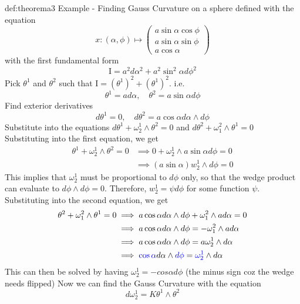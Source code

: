 \documentclass[landscape, 8pt]{extarticle}
\begin{document}
\begin{multicols}{3}
\begin{xmp}{def:theorema}{3}
    Example - Finding Gauss Curvature on a sphere defined with the equation
    \[x:(\alpha, \phi)\mapsto \begin{pmatrix}
        a\sin\alpha \cos\phi \\
        a\sin\alpha \sin\phi \\
        a\cos\alpha
    \end{pmatrix}\]
    with the first fundamental form
    \[\mathrm{I} = a^{2}d\alpha^{2} + a^{2}\sin^{2}\alpha d\phi^{2}\]
    Pick \(\theta^{1}\) and \(\theta^{2}\) such that \(\mathrm{I} = (\theta^{1})^{2} + (\theta^{1})^{2}\). i.e.
    \[\theta^{1} = ad\alpha,\quad \theta^{2} = a\sin\alpha d\phi\]
    Find exterior derivatives
    \[d\theta^{1} = 0 , \quad d\theta^{2} = a\cos\alpha d\alpha\wedge d\phi\]
    Substitute into the equations \(d\theta^{1} + \omega^{1}_{2}\wedge \theta^{2} = 0\) and \(d\theta^{2} + \omega^{2}_{1}\wedge \theta^{1} = 0\)
    Substituting into the first equation, we get
    \begin{align*}
        \theta^{1} + \omega^{1}_{2}\wedge \theta^{2} = 0 &\implies 0 + \omega^{1}_{2}\wedge a\sin\alpha d\phi = 0 \\
        &\implies (a\sin\alpha) w^{1}_{2} \wedge d\phi = 0
    \end{align*}
    This implies that \(\omega^{1}_{2}\) must be proportional to \(d\phi\) only, so that the wedge product can evaluate to \(d\phi \wedge d\phi = 0\). Therefore, \(w^{1}_{2} = \psi d\phi\) for some function \(\psi\). Substituting into the second equation, we get
    \begin{align*}
        \theta^{2} + \omega^{2}_{1}\wedge \theta^{1} = 0 &\implies a\cos\alpha d\alpha\wedge d\phi + \omega^{2}_{1}\wedge ad\alpha = 0 \\
        &\implies a\cos\alpha d\alpha\wedge d\phi = -\omega^{2}_{1}\wedge ad\alpha \\
        &\implies a\cos\alpha d\alpha\wedge d\phi = a\omega^{1}_{2}\wedge d\alpha \\
        &\implies \textcolor{blue}{\cos\alpha} d\alpha\wedge \textcolor{blue}{d\phi} = \textcolor{blue}{\omega^{1}_{2}}\wedge d\alpha \\
    \end{align*}
    This can then be solved by having \(\omega^{1}_{2} = -cos\alpha d\phi\) (the minus sign coz the wedge needs flipped)
    Now we can find the Gauss Curvature with the equation
    \[d\omega^{1}_{2} = K\theta^{1}\wedge \theta^{2}\]

\end{xmp}
\end{multicols}
\end{document}
